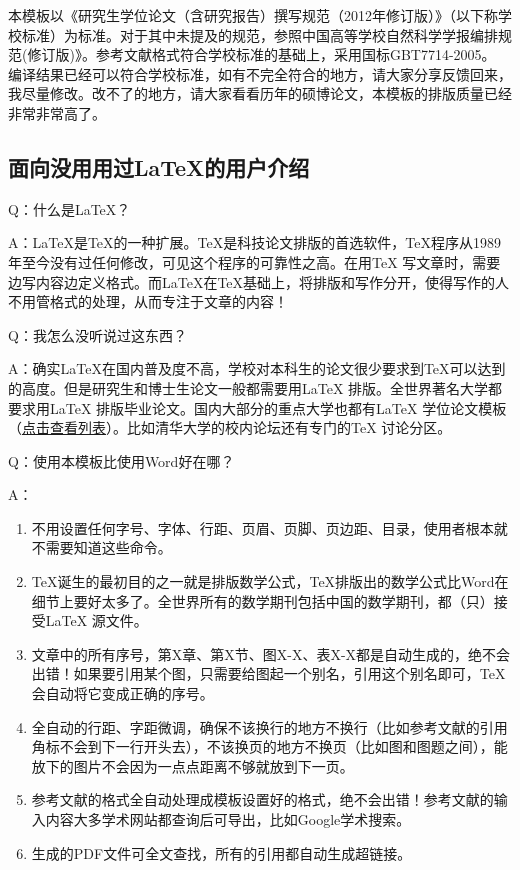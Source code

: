 本模板以《研究生学位论文（含研究报告）撰写规范（2012年修订版）》（以下称学校标准）为标准。对于其中未提及的规范，参照中国高等学校自然科学学报编排规范(修订版)》。参考文献格式符合学校标准的基础上，采用国标GBT7714-2005。 编译结果已经可以符合学校标准，如有不完全符合的地方，请大家分享反馈回来，我尽量修改。改不了的地方，请大家看看历年的硕博论文，本模板的排版质量已经非常非常高了。
\subsection{面向没用用过\LaTeX{}的用户介绍}
    Q：什么是\LaTeX{}？

A：\LaTeX{}是\TeX{}的一种扩展。\TeX{}是科技论文排版的首选软件，\TeX{}程序从1989 年至今没有过任何修改，可见这个程序的可靠性之高。在用\TeX{} 写文章时，需要边写内容边定义格式。而\LaTeX{}在\TeX{}基础上，将排版和写作分开，使得写作的人不用管格式的处理，从而专注于文章的内容！

Q：我怎么没听说过这东西？

A：确实\LaTeX{}在国内普及度不高，学校对本科生的论文很少要求到\TeX{}可以达到的高度。但是研究生和博士生论文一般都需要用\LaTeX{} 排版。全世界著名大学都要求用\LaTeX{} 排版毕业论文。国内大部分的重点大学也都有\LaTeX{} 学位论文模板（\href{http://zzg34b.w3.c361.com/templet/graduateThesis.htm}{点击查看列表}）。比如清华大学的校内论坛还有专门的TeX 讨论分区。

Q：使用本模板比使用Word好在哪？

A：
\begin{enumerate}
\item 不用设置任何字号、字体、行距、页眉、页脚、页边距、目录，使用者根本就不需要知道这些命令。
\item \TeX{}诞生的最初目的之一就是排版数学公式，\TeX{}排版出的数学公式比Word在细节上要好太多了。全世界所有的数学期刊包括中国的数学期刊，都（只）接受\LaTeX{} 源文件。
\item 文章中的所有序号，第X章、第X节、图X-X、表X-X都是自动生成的，绝不会出错！如果要引用某个图，只需要给图起一个别名，引用这个别名即可，TeX 会自动将它变成正确的序号。
\item 全自动的行距、字距微调，确保不该换行的地方不换行（比如参考文献的引用角标不会到下一行开头去），不该换页的地方不换页（比如图和图题之间），能放下的图片不会因为一点点距离不够就放到下一页。
\item 参考文献的格式全自动处理成模板设置好的格式，绝不会出错！参考文献的输入内容大多学术网站都查询后可导出，比如Google学术搜索。
\item 生成的PDF文件可全文查找，所有的引用都自动生成超链接。
\end{enumerate}

